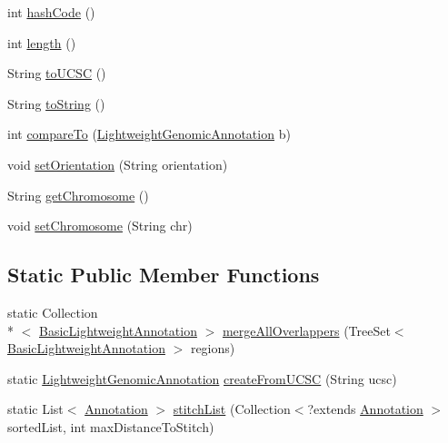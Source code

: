 \begin{DoxyCompactItemize}
\item 
int \hyperlink{classbroad_1_1core_1_1annotation_1_1_basic_lightweight_annotation_ac12df313b55e4bb561f0ee2f5cc8b610}{hash\+Code} ()
\item 
int \hyperlink{classbroad_1_1core_1_1annotation_1_1_basic_lightweight_annotation_a3a88df9b3819805512b53a4c054785c9}{length} ()
\item 
String \hyperlink{classbroad_1_1core_1_1annotation_1_1_basic_lightweight_annotation_a82903ca4b9f07f9b7bcafe7ef43afd82}{to\+U\+C\+S\+C} ()
\item 
String \hyperlink{classbroad_1_1core_1_1annotation_1_1_basic_lightweight_annotation_a1c548c67447aa8ad08f8312d3f30c3d9}{to\+String} ()
\item 
int \hyperlink{classbroad_1_1core_1_1annotation_1_1_basic_lightweight_annotation_a153aadccdd60d81d71286ab8185e0687}{compare\+To} (\hyperlink{interfacebroad_1_1core_1_1annotation_1_1_lightweight_genomic_annotation}{Lightweight\+Genomic\+Annotation} b)
\item 
void \hyperlink{classbroad_1_1core_1_1annotation_1_1_basic_lightweight_annotation_a4fc2bd00d303328100e8bd20d2c6dd49}{set\+Orientation} (String orientation)
\item 
String \hyperlink{classbroad_1_1core_1_1annotation_1_1_basic_lightweight_annotation_a3c3c393894b2c4d90334dda13a148eec}{get\+Chromosome} ()
\item 
void \hyperlink{classbroad_1_1core_1_1annotation_1_1_basic_lightweight_annotation_aeb96f44edbf4809956fe995a5cb3fc36}{set\+Chromosome} (String chr)
\end{DoxyCompactItemize}
\subsection*{Static Public Member Functions}
\begin{DoxyCompactItemize}
\item 
static Collection\\*
$<$ \hyperlink{classbroad_1_1core_1_1annotation_1_1_basic_lightweight_annotation}{Basic\+Lightweight\+Annotation} $>$ \hyperlink{classbroad_1_1core_1_1annotation_1_1_basic_lightweight_annotation_ab9c2cce66e01225f9f12dd3a1edde9da}{merge\+All\+Overlappers} (Tree\+Set$<$ \hyperlink{classbroad_1_1core_1_1annotation_1_1_basic_lightweight_annotation}{Basic\+Lightweight\+Annotation} $>$ regions)
\item 
static \hyperlink{interfacebroad_1_1core_1_1annotation_1_1_lightweight_genomic_annotation}{Lightweight\+Genomic\+Annotation} \hyperlink{classbroad_1_1core_1_1annotation_1_1_basic_lightweight_annotation_a5c367cdb862fa07a36c30a41a1c27994}{create\+From\+U\+C\+S\+C} (String ucsc)
\item 
static List$<$ \hyperlink{interfaceumms_1_1core_1_1annotation_1_1_annotation}{Annotation} $>$ \hyperlink{classbroad_1_1core_1_1annotation_1_1_basic_lightweight_annotation_a0ae4c3d5c0d8a32ead8146b275a461be}{stitch\+List} (Collection$<$?extends \hyperlink{interfaceumms_1_1core_1_1annotation_1_1_annotation}{Annotation} $>$ sorted\+List, int max\+Distance\+To\+Stitch)
\end{DoxyCompactItemize}
